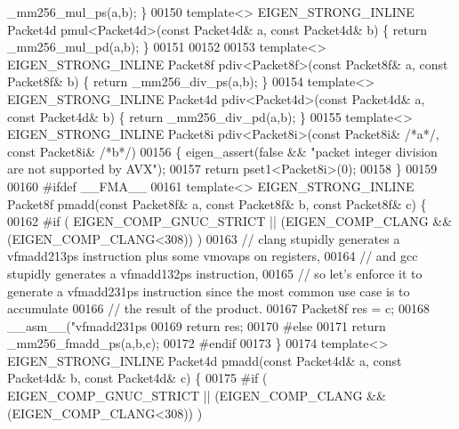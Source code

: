 \begin{DoxyCode}
      \_mm256\_mul\_ps(a,b); \}
00150 \textcolor{keyword}{template}<> EIGEN\_STRONG\_INLINE Packet4d pmul<Packet4d>(\textcolor{keyword}{const} Packet4d& a, \textcolor{keyword}{const} Packet4d& b) \{ \textcolor{keywordflow}{return} 
      \_mm256\_mul\_pd(a,b); \}
00151 
00152 
00153 \textcolor{keyword}{template}<> EIGEN\_STRONG\_INLINE Packet8f pdiv<Packet8f>(\textcolor{keyword}{const} Packet8f& a, \textcolor{keyword}{const} Packet8f& b) \{ \textcolor{keywordflow}{return} 
      \_mm256\_div\_ps(a,b); \}
00154 \textcolor{keyword}{template}<> EIGEN\_STRONG\_INLINE Packet4d pdiv<Packet4d>(\textcolor{keyword}{const} Packet4d& a, \textcolor{keyword}{const} Packet4d& b) \{ \textcolor{keywordflow}{return} 
      \_mm256\_div\_pd(a,b); \}
00155 \textcolor{keyword}{template}<> EIGEN\_STRONG\_INLINE Packet8i pdiv<Packet8i>(\textcolor{keyword}{const} Packet8i& \textcolor{comment}{/*a*/}, \textcolor{keyword}{const} Packet8i& \textcolor{comment}{/*b*/})
00156 \{ eigen\_assert(\textcolor{keyword}{false} && \textcolor{stringliteral}{"packet integer division are not supported by AVX"});
00157   \textcolor{keywordflow}{return} pset1<Packet8i>(0);
00158 \}
00159 
00160 \textcolor{preprocessor}{#ifdef \_\_FMA\_\_}
00161 \textcolor{keyword}{template}<> EIGEN\_STRONG\_INLINE Packet8f pmadd(\textcolor{keyword}{const} Packet8f& a, \textcolor{keyword}{const} Packet8f& b, \textcolor{keyword}{const} Packet8f& c) \{
00162 \textcolor{preprocessor}{#if ( EIGEN\_COMP\_GNUC\_STRICT || (EIGEN\_COMP\_CLANG && (EIGEN\_COMP\_CLANG<308)) )}
00163   \textcolor{comment}{// clang stupidly generates a vfmadd213ps instruction plus some vmovaps on registers,}
00164   \textcolor{comment}{// and gcc stupidly generates a vfmadd132ps instruction,}
00165   \textcolor{comment}{// so let's enforce it to generate a vfmadd231ps instruction since the most common use case is to
       accumulate}
00166   \textcolor{comment}{// the result of the product.}
00167   Packet8f res = c;
00168   \_\_asm\_\_(\textcolor{stringliteral}{"vfmadd231ps %
00169   \textcolor{keywordflow}{return} res;
00170 \textcolor{preprocessor}{#else}
00171   \textcolor{keywordflow}{return} \_mm256\_fmadd\_ps(a,b,c);
00172 \textcolor{preprocessor}{#endif}
00173 \}
00174 \textcolor{keyword}{template}<> EIGEN\_STRONG\_INLINE Packet4d pmadd(\textcolor{keyword}{const} Packet4d& a, \textcolor{keyword}{const} Packet4d& b, \textcolor{keyword}{const} Packet4d& c) \{
00175 \textcolor{preprocessor}{#if ( EIGEN\_COMP\_GNUC\_STRICT || (EIGEN\_COMP\_CLANG && (EIGEN\_COMP\_CLANG<308)) )}
}
\end{DoxyCode}

